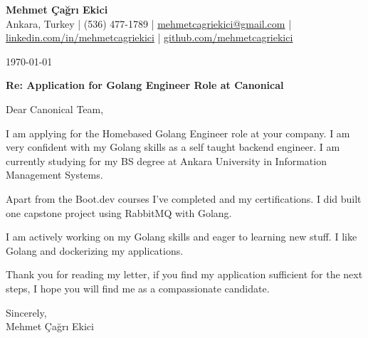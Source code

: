 \documentclass[11pt]{letter}
\begin{document}
{\Large \textbf{Mehmet Çağrı Ekici}}\\
Ankara, Turkey \;|\; (536) 477-1789 \;|\; \href{mailto:mehmetcagriekici@gmail.com}{mehmetcagriekici@gmail.com} \;|\;
\href{https://linkedin.com/in/mehmetcagriekici}{linkedin.com/in/mehmetcagriekici} \;|\;
\href{https://github.com/mehmetcagriekici}{github.com/mehmetcagriekici}

\vspace{0.6cm}

\today

\vspace{0.4cm}

\textbf{Re: Application for Golang Engineer Role at Canonical}

\vspace{0.4cm}

Dear Canonical Team,

I am applying for the Homebased Golang Engineer role at your company. I am very confident with my Golang skills as a self taught backend engineer. I am currently studying for my BS degree at Ankara University in Information Management Systems.  

Apart from the Boot.dev courses I've completed and my certifications. I did built one capstone project using RabbitMQ with Golang.

I am actively working on my Golang skills and eager to learning new stuff. I like Golang and dockerizing my applications.

Thank you for reading my letter, if you find my application sufficient for the next steps, I hope you will find me as a compassionate candidate.

Sincerely,\\
\vspace{0.2cm}
Mehmet Çağrı Ekici
\end{document}

